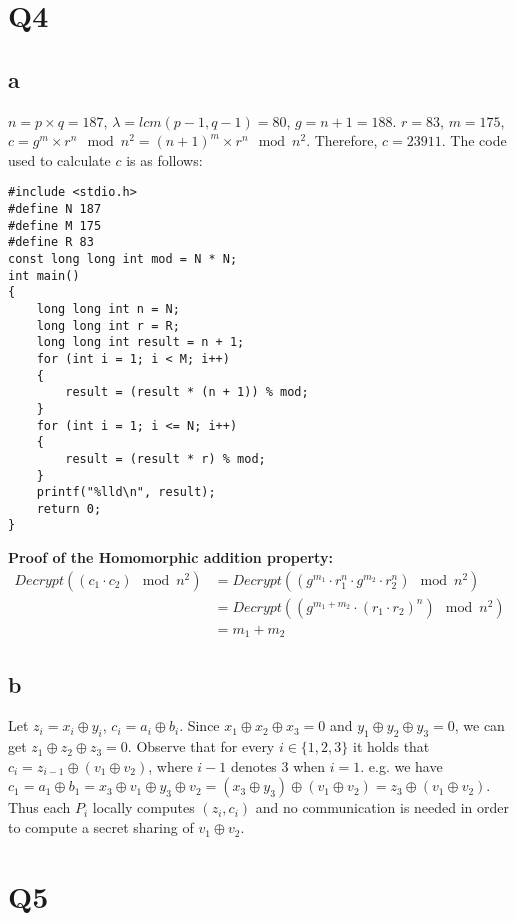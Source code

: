 \documentclass[12pt]{article}
\begin{document}
\section{Q4}
\subsection{a}
$n=p\times q=187$, $\lambda=lcm(p-1,q-1)=80$, $g=n+1=188$.
$r=83$, $m=175$, $c=g^m\times r^n\mod n^2=(n+1)^m\times r^n\mod n^2$. Therefore, $c=23911$.
\newline
The code used to calculate $c$ is as follows:
\begin{lstlisting}
#include <stdio.h>
#define N 187
#define M 175
#define R 83
const long long int mod = N * N;
int main()
{
    long long int n = N;
    long long int r = R;
    long long int result = n + 1;
    for (int i = 1; i < M; i++)
    {
        result = (result * (n + 1)) % mod;
    }
    for (int i = 1; i <= N; i++)
    {
        result = (result * r) % mod;
    }
    printf("%lld\n", result);
    return 0;
}
\end{lstlisting}
\textbf{Proof of the Homomorphic addition property:}
\begin{align*}
    Decrypt((c_1\cdot c_2)\mod n^2) & = Decrypt((g^{m_1}\cdot r_1^n\cdot g^{m_2}\cdot r_2^n)\mod n^2) \\
                                    & = Decrypt((g^{m_1+m_2}\cdot (r_1\cdot r_2)^n)\mod n^2)          \\
                                    & = m_1+m_2
\end{align*}
\subsection{b}
Let $z_i=x_i\oplus y_i$, $c_i=a_i\oplus b_i$. Since $x_1\oplus x_2\oplus x_3=0$ and $y_1\oplus y_2\oplus y_3=0$, we can get $z_1\oplus z_2\oplus z_3=0$.
Observe that for every $i\in\{1,2,3\}$ it holds that $c_i=z_{i-1}\oplus(v_1\oplus v_2)$, where $i-1$ denotes $3$ when $i=1$. e.g. we have $c_1=a_1\oplus b_1=x_3\oplus v_1\oplus y_3\oplus v_2=(x_3\oplus y_3)\oplus(v_1\oplus v_2)=z_3\oplus(v_1\oplus v_2)$.
Thus each $P_i$ locally computes $(z_i,c_i)$ and no communication is needed in order to compute a secret sharing of $v_1\oplus v_2$.

\section{Q5}
\end{document}

